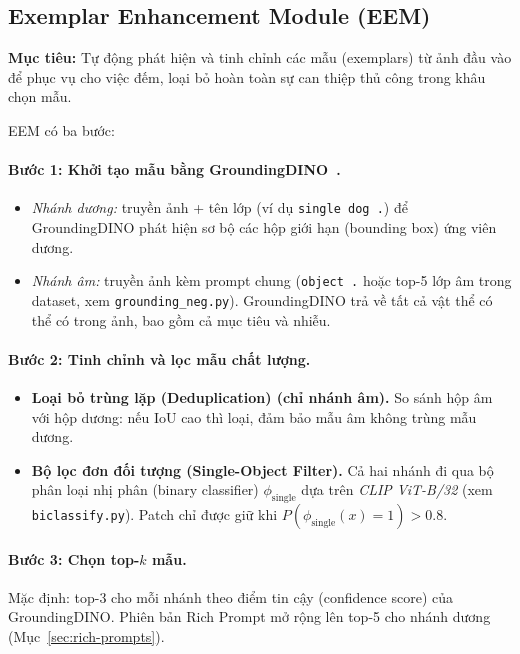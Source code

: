 \documentclass[a4paper,12pt]{report}
\numberwithin{figure}{chapter}
\numberwithin{table}{chapter}
\begin{document}
\subsection{Exemplar Enhancement Module (EEM)}
\label{subsec:eem}

\textbf{Mục tiêu:} Tự động phát hiện và tinh chỉnh các mẫu (exemplars) từ ảnh đầu vào để phục vụ cho việc đếm, loại bỏ hoàn toàn sự can thiệp thủ công trong khâu chọn mẫu.

EEM có ba bước:

\paragraph{Bước 1: Khởi tạo mẫu bằng GroundingDINO~\cite{groundingdino}.}
\begin{itemize}
    \item \textit{Nhánh dương:} truyền ảnh + tên lớp (ví dụ \texttt{single dog .}) để GroundingDINO phát hiện sơ bộ các hộp giới hạn (bounding box) ứng viên dương.
    \item \textit{Nhánh âm:} truyền ảnh kèm prompt chung (\texttt{object .} hoặc top-5 lớp âm trong dataset, xem \texttt{grounding\_neg.py}). GroundingDINO trả về tất cả vật thể có thể có trong ảnh, bao gồm cả mục tiêu và nhiễu.
\end{itemize}

\paragraph{Bước 2: Tinh chỉnh và lọc mẫu chất lượng.}
\begin{itemize}
    \item \textbf{Loại bỏ trùng lặp (Deduplication) (chỉ nhánh âm).} So sánh hộp âm với hộp dương: nếu IoU cao thì loại, đảm bảo mẫu âm không trùng mẫu dương.
    \item \textbf{Bộ lọc đơn đối tượng (Single-Object Filter).} Cả hai nhánh đi qua bộ phân loại nhị phân (binary classifier) $\phi_{\text{single}}$ dựa trên \textit{CLIP ViT-B/32} (xem \texttt{biclassify.py}). Patch chỉ được giữ khi $P(\phi_{\text{single}}(x)=1) > 0.8$.
\end{itemize}

\paragraph{Bước 3: Chọn top-$k$ mẫu.} Mặc định: top-3 cho mỗi nhánh theo điểm tin cậy (confidence score) của GroundingDINO. Phiên bản Rich Prompt mở rộng lên top-5 cho nhánh dương (Mục~\ref{sec:rich-prompts}).
\end{document}
